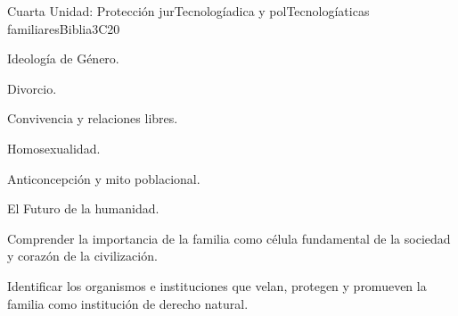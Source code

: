 \begin{syllabus}
\begin{unit}{}{Cuarta Unidad: Protección jurTecnologíadica y polTecnologíaticas familiares}{Biblia}{3}{C20}
\begin{topics}
	\item Ideología de Género.
	\item Divorcio.
	\item Convivencia y relaciones libres.
	\item Homosexualidad.
	\item Anticoncepción y mito poblacional.
	\item El Futuro de la humanidad.
\end{topics}
\begin{learningoutcomes}
	\item Comprender la importancia de la familia como célula fundamental de la sociedad y corazón de la civilización.
    \item Identificar los organismos e instituciones que velan, protegen y promueven la familia como institución de derecho natural.
\end{learningoutcomes}
\end{unit}



\begin{coursebibliography}
\end{coursebibliography}

\end{syllabus}
